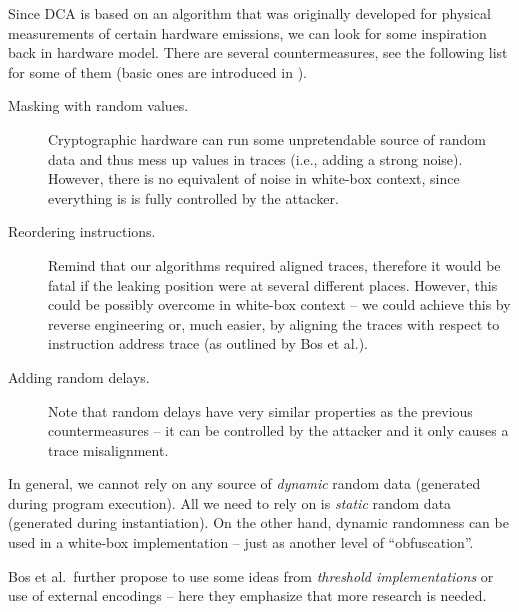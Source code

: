 Since DCA is based on an algorithm that was originally developed for physical measurements of certain hardware emissions, we can look for some inspiration back in hardware model. There are several countermeasures, see the following list for some of them (basic ones are introduced in \cite{chari1999towards,goubin1999des}).
\begin{description}
	\item[Masking with random values.] Cryptographic hardware can run some unpretendable source of random data and thus mess up values in traces (i.e., adding a strong noise). However, there is no equivalent of noise in white-box context, since everything is is fully controlled by the attacker.
	\item[Reordering instructions.] Remind that our algorithms required aligned traces, therefore it would be fatal if the leaking position were at several different places. However, this could be possibly overcome in white-box context -- we could achieve this by reverse engineering or, much easier, by aligning the traces with respect to instruction address trace (as outlined by Bos et al.).
	\item[Adding random delays.] Note that random delays have very similar properties as the previous countermeasures -- it can be controlled by the attacker and it only causes a trace misalignment.
\end{description}
In general, we cannot rely on any source of {\em dynamic} random data (generated during program execution). All we need to rely on is {\em static} random data (generated during instantiation). On the other hand, dynamic randomness can be used in a white-box implementation -- just as another level of ``obfuscation''.

Bos et al.\ further propose to use some ideas from {\em threshold implementations} \cite{nikova2006threshold} or use of external encodings -- here they emphasize that more research is needed.

